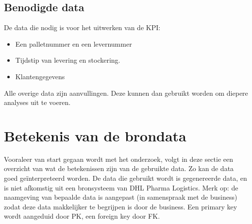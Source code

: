 \subsection{Benodigde data}
De data die nodig is voor het uitwerken van de KPI:
\begin{itemize}
	\item Een palletnummer en een levernummer
	\item Tijdstip van levering en stockering.
	\item Klantengegevens
\end{itemize} 

Alle overige data zijn aanvullingen. Deze kunnen dan gebruikt worden om diepere analyses uit te voeren.

\section{Betekenis van de brondata}
\label{sec:betekenisdata}
Vooraleer van start gegaan wordt met het onderzoek, volgt in deze sectie een overzicht van wat de betekenissen zijn van de gebruikte data. Zo kan de data goed geïnterpreteerd worden. De data die gebruikt wordt is gegenereerde data, en is niet afkomstig uit een bronsysteem van DHL Pharma Logistics. Merk op: de naamgeving van bepaalde data is aangepast (in samenspraak met de business) zodat deze data makkelijker te begrijpen is door de business. Een primary key wordt aangeduid door PK, een foreign key door FK.

